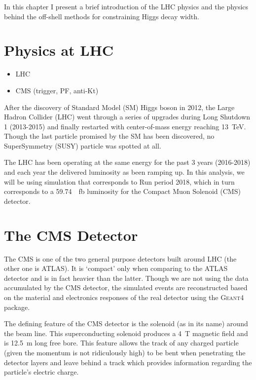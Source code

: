 \newcommand{\gf}{\textsc{Geant4}\xspace}
\newpage

In this chapter I present a brief introduction of the
LHC physics and the physics behind the off-shell methods
for constraining Higgs decay width.

\section{Physics at LHC}
\begin{itemize}
    \item LHC
    \item CMS (trigger, PF, anti-Kt)
\end{itemize}

After the discovery of Standard Model (SM) Higgs boson in 2012, the Large Hadron Collider (LHC)
went through a series of upgrades during Long Shutdown 1 (2013-2015) and finally restarted with center-of-mass energy reaching
\SI{13}{\tera\electronvolt}. Though the last particle promised by the SM has been discovered,
no SuperSymmetry (SUSY) particle was spotted at all.

The LHC has been operating at the same energy for the past 3 years (2016-2018) and each year
the delivered luminosity as been ramping up.\cite{xampl} In this analysis, we will be using
simulation that corresponds to Run period 2018, which in turn corresponds to a 
\SI{59.74}{\per\femto\barn} luminosity for the Compact Muon Solenoid (CMS) detector.\cite{xampl}


\section{The CMS Detector}
The CMS is one of the two general purpose detectors built around LHC (the other one is ATLAS). It
is `compact' only when comparing to the ATLAS detector and is in fact heavier than the latter.
Though we are not using the data accumulated by the CMS detector, the simulated events are
reconstructed based on the material and electronics responses of the real detector using the
\gf{} package.\cite{geant4}

The defining feature of the CMS detector is the solenoid (as in its name) around the beam line.
This superconducting solenoid produces a \SI{4}{\tesla} magnetic field and is 
\SI{12.5}{\meter} long free bore.\cite{validation of cms} This feature allows the track of
any charged particle (given the momentum is not ridiculously high) to be bent when penetrating
the detector layers and leave behind a track which provides information regarding the particle's 
electric charge.

